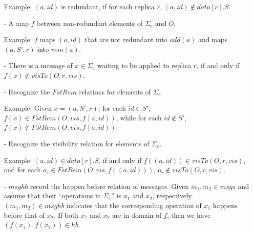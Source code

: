 Example: $(a,\mathit{id})$ is redundant, if for each replica $r$, $(a,\mathit{id}) \notin \mathit{data}[r].S$.

\noindent - A map $f$ between non-redundant elements of $\Sigma_e$ and $O$.%

Example: $f$ maps $(a,\mathit{id})$ that are not redundant into $\mathit{add}(a)$ and maps $(a,S',r)$ into $\mathit{rem}(a)$.


\noindent - There is a message of $x \in \Sigma_e$ waiting to be applied to replica $r$, if and only if $f(x) \notin \mathit{visTo}(O,r,\mathit{vis})$.

\noindent - Recognize the $\mathit{FstRem}$ relations for elements of $\Sigma_e$.

Example: Given $x=(a,S',r)$: for each $\mathit{id} \in S'$, $f(x) \in \mathit{FstRem}(O,\mathit{vis},f(a,\mathit{id}))$; while for each $\mathit{id} \notin S'$, $f(x) \notin \mathit{FstRem}(O,\mathit{vis},f(a,\mathit{id}))$.

\noindent - Recognize the visibility relation for elements of $\Sigma_e$.

Example: $(a,\mathit{id}) \in data[r].S$, if and only if $f((a,\mathit{id})) \in \mathit{visTo}(O,r,\mathit{vis})$, and for each $o_r \in \mathit{FstRem}(O,\mathit{vis},f((a,\mathit{id})))$, $o_r \notin \mathit{visTo}(O,r,\mathit{vis})$.

\noindent - {\color {red}$\mathit{msghb}$ record the happen before relation of messages. Given $m_1,m_2 \in \mathit{msgs}$ and assume that their ``operations in $\Sigma_e$'' is $x_1$ and $x_2$, respectively. $(m_1,m_2) \in \mathit{msghb}$ indicates that the corresponding operation of $x_1$ happens before that of $x_2$. If both $x_1$ and $x_2$ are in domain of $f$, then we have $(f(x_1),f(x_2)) \in \mathit{hb}$.}



